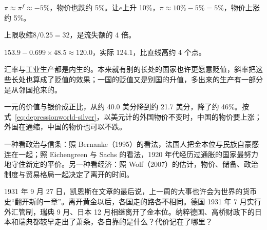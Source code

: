 \begin{answers}
\item $\pi\approx\pi^{f}\approx-5\%$，物价也跌约 5\%。让$e$上升 10\%，$\pi\approx10\%-5\%=5\%$，物价上涨约 5\%。
\item 上限收缩$8/0.25=32$，是流失额的 4 倍。
\item $153.9-0.699\times48.5\approx120.0$，实际 124.1，比直线高约 4 个点。
\item 汇率与工业生产都是内生的。本来就有别的长处的国家也许更愿意贬值，斜率把这些长处也算成了贬值的效果；一国的贬值又是别国的升值，多出来的生产有一部分是从邻国抢来的。
\item 一元的价值与银价成正比，从约 40.0 美分降到约 21.7 美分，降了约 46\%。按式~\eqref{eq:depressionworld-silver}，以美元计的外国物价不变时，中国的物价要上涨；外国在通缩，中国的物价也可以不跌。
\item 一种看政治与信条：照 Bernanke（1995）的看法，法国人把金本位与民族自豪感连在一起；照 Eichengreen 与 Sachs 的看法，1920 年代经历过通胀的国家最努力地守住新定的平价。另一种看经济：照 Wolf（2007）的估计，物价、储备、政治制度与贸易格局一起决定了离开的时间。
\end{answers}

1931 年 9 月 27 日，凯恩斯在文章的最后说，上一周的大事也许会为世界的货币史“翻开新的一章”\cite{keynes1931}。离开黄金以后，各国走的路各不相同。德国 1931 年 7 月实行外汇管制，瑞典 9 月、日本 12 月相继离开了金本位\cite{bernanke1991}。纳粹德国、高桥财政下的日本和瑞典都较早走出了萧条，各自靠的是什么？代价记在了哪里？
